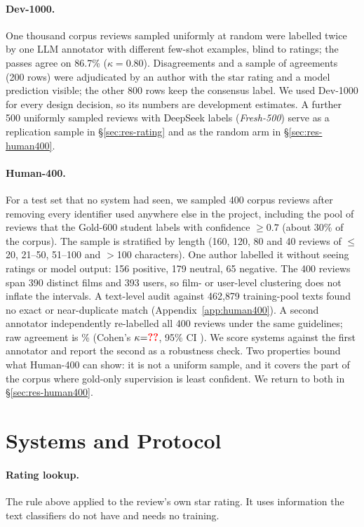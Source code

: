 \paragraph{Dev-1000.} One thousand corpus reviews sampled uniformly
at random were labelled twice by one LLM annotator with different
few-shot examples, blind to ratings; the passes agree on 86.7\%
($\kappa{=}0.80$). Disagreements and a sample of agreements (200 rows)
were adjudicated by an author with the star rating and a model
prediction visible; the other 800 rows keep the consensus label. We used Dev-1000 for every
design decision, so its numbers are development estimates. A further
500 uniformly sampled reviews with DeepSeek labels (\emph{Fresh-500})
serve as a replication sample in \S\ref{sec:res-rating} and as the
random arm in \S\ref{sec:res-human400}.

\paragraph{Human-400.} For a test set that no system had seen, we
sampled 400 corpus reviews after removing every identifier used
anywhere else in the project, including the pool of reviews that the
Gold-600 student labels with confidence $\geq 0.7$ (about 30\% of the
corpus). The sample is stratified by length (160, 120, 80 and 40
reviews of $\leq$20, 21--50, 51--100 and $>$100 characters). One
author labelled it without seeing ratings or model output: 156
positive, 179 neutral, 65 negative. The 400 reviews span 390 distinct
films and 393 users, so film- or user-level clustering does not
inflate the intervals. A text-level audit against
462{,}879 training-pool texts found no exact or near-duplicate match
(Appendix~\ref{app:human400}).
\ifSfive A second annotator independently re-labelled all 400 reviews
under the same guidelines; raw agreement is \IAAraw\% (Cohen's
$\kappa{=}\IAAkappa$, 95\% CI \IAAkappaCI). We score systems against
the first annotator and report the second as a robustness check.\fi
Two properties bound what Human-400 can show: it is not a uniform
sample, and it covers the part of the corpus where gold-only
supervision is least confident. We return to both in
\S\ref{sec:res-human400}.

\section{Systems and Protocol}
\label{sec:method}

\paragraph{Rating lookup.} The rule above applied to the review's own
star rating. It uses information the text classifiers do not have and
needs no training.

